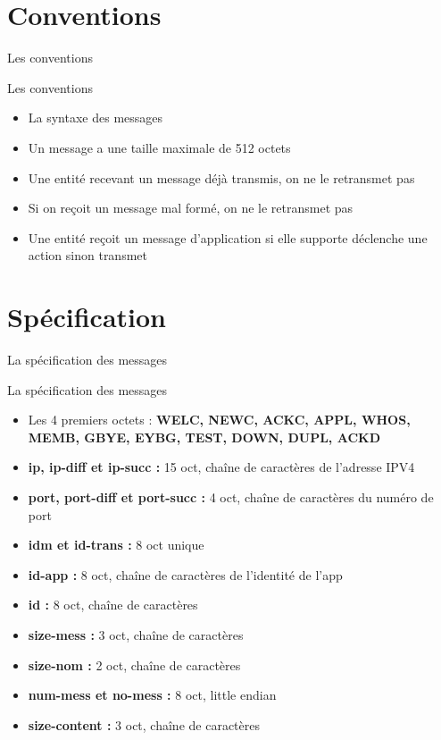 \documentclass{beamer}
\begin{document}
\section{Conventions}
\begin{frame}
	\begin{center}
		{\Huge Les conventions}
	\end{center}
\end{frame}

\begin{frame}{Les conventions}
	 \begin{itemize}
		 \item<1-5> La syntaxe des messages
		 \item<2-5> Un message a une taille maximale de 512 octets
 		 \item<3-5> Une entité recevant un message déjà transmis, on ne le retransmet pas
 		 \item<4-5> Si on reçoit un message mal formé, on ne le retransmet pas
 		 \item<5-5> Une entité reçoit un message d'application si elle supporte déclenche une action sinon transmet
	\end{itemize}
\end{frame}

\section{Spécification}
\begin{frame}
	\begin{center}
		{\Huge La spécification des messages}
	\end{center}
\end{frame}

\begin{frame}{La spécification des messages}
	 \begin{itemize}
		 \item<1-11> Les 4 premiers octets : \textbf{WELC, NEWC, ACKC, APPL, WHOS, MEMB, GBYE, EYBG, TEST, DOWN, DUPL, ACKD}
		 \item<2-11> \textbf{ip, ip-diff et ip-succ :} 15 oct, chaîne de caractères de l'adresse IPV4
 		 \item<3-11> \textbf{port, port-diff et port-succ :} 4 oct, chaîne de caractères du numéro de port
 		 \item<4-11> \textbf{idm et id-trans :} 8 oct unique
 		 \item<5-11> \textbf{id-app :} 8 oct, chaîne de caractères de l'identité de l'app
 		 \item<6-11> \textbf{id :} 8 oct, chaîne de caractères
 		 \item<7-11> \textbf{size-mess :} 3 oct, chaîne de caractères 
 		 \item<8-11> \textbf{size-nom :} 2 oct, chaîne de caractères
 		 \item<9-11> \textbf{num-mess et no-mess :} 8 oct, little endian
 		 \item<10-11> \textbf{size-content :} 3 oct, chaîne de caractères
	\end{itemize}
\end{frame}
\end{document}
